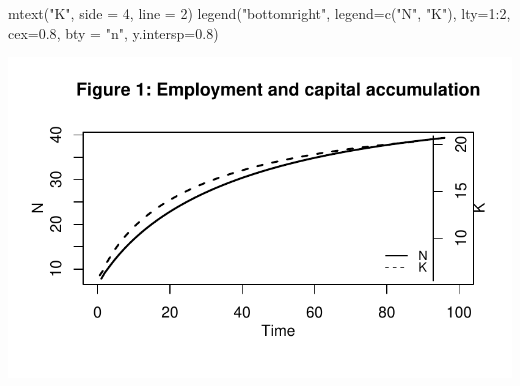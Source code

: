 \documentclass[
  letterpaper,
  DIV=11,
  numbers=noendperiod]{scrreprt}
\newenvironment{Shaded}{\begin{snugshade}}{\end{snugshade}}
\newcommand{\AttributeTok}[1]{\textcolor[rgb]{0.40,0.45,0.13}{#1}}
\newcommand{\DecValTok}[1]{\textcolor[rgb]{0.68,0.00,0.00}{#1}}
\newcommand{\FloatTok}[1]{\textcolor[rgb]{0.68,0.00,0.00}{#1}}
\newcommand{\FunctionTok}[1]{\textcolor[rgb]{0.28,0.35,0.67}{#1}}
\newcommand{\NormalTok}[1]{\textcolor[rgb]{0.00,0.23,0.31}{#1}}
\newcommand{\SpecialCharTok}[1]{\textcolor[rgb]{0.37,0.37,0.37}{#1}}
\newcommand{\StringTok}[1]{\textcolor[rgb]{0.13,0.47,0.30}{#1}}
\begin{document}
\begin{Shaded}
\begin{Highlighting}[]
\FunctionTok{mtext}\NormalTok{(}\StringTok{"K"}\NormalTok{, }\AttributeTok{side =} \DecValTok{4}\NormalTok{, }\AttributeTok{line =} \DecValTok{2}\NormalTok{)}
\FunctionTok{legend}\NormalTok{(}\StringTok{"bottomright"}\NormalTok{, }\AttributeTok{legend=}\FunctionTok{c}\NormalTok{(}\StringTok{"N"}\NormalTok{, }\StringTok{"K"}\NormalTok{),}
       \AttributeTok{lty=}\DecValTok{1}\SpecialCharTok{:}\DecValTok{2}\NormalTok{, }\AttributeTok{cex=}\FloatTok{0.8}\NormalTok{, }\AttributeTok{bty =} \StringTok{"n"}\NormalTok{, }\AttributeTok{y.intersp=}\FloatTok{0.8}\NormalTok{)}
\end{Highlighting}
\end{Shaded}

\includegraphics{a_ricardian_two_sector_model_files/figure-pdf/ricardo2_2-1.pdf}
\end{document}
